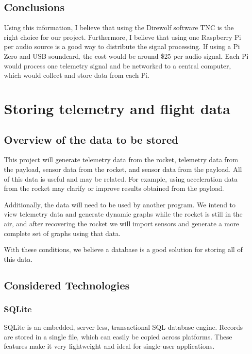 \documentclass[onecolumn, draftclsnofoot, 10pt, compsoc]{IEEEtran}
\begin{document}
\subsection{Conclusions}
Using this information, I believe that using the Direwolf software TNC is the right choice for our project. Furthermore, I believe that using one Raspberry Pi per audio source is a good way to distribute the signal processing.  If using a Pi Zero and USB soundcard, the cost would be around \$25 per audio signal.  Each Pi would process one telemetry signal and be networked to a central computer, which would collect and store data from each Pi.

\section{Storing telemetry and flight data}

\subsection{Overview of the data to be stored}
This project will generate telemetry data from the rocket, telemetry data from the payload, sensor data from the rocket, and sensor data from the payload.  All of this data is useful and may be related.  For example, using acceleration data from the rocket may clarify or improve results obtained from the payload.

Additionally, the data will need to be used by another program.  We intend to view telemetry data and generate dynamic graphs while the rocket is still in the air, and after recovering the rocket we will import sensors and generate a more complete set of graphs using that data.

With these conditions, we believe a database is a good solution for storing all of this data.

\subsection{Considered Technologies}

\subsubsection{SQLite}
SQLite is an embedded, server-less, transactional SQL database engine.  Records are stored in a single file, which can easily be copied across platforms.  These features make it very lightweight and ideal for single-user applications.\cite{5}
\end{document}
